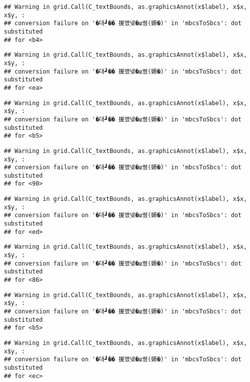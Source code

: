 \documentclass[
]{article}
\begin{document}
\begin{verbatim}
## Warning in grid.Call(C_textBounds, as.graphicsAnnot(x$label), x$x, x$y, :
## conversion failure on '�대┛�� 援먰넻�ш퀬(嫄�)' in 'mbcsToSbcs': dot substituted
## for <b4>
\end{verbatim}

\begin{verbatim}
## Warning in grid.Call(C_textBounds, as.graphicsAnnot(x$label), x$x, x$y, :
## conversion failure on '�대┛�� 援먰넻�ш퀬(嫄�)' in 'mbcsToSbcs': dot substituted
## for <ea>
\end{verbatim}

\begin{verbatim}
## Warning in grid.Call(C_textBounds, as.graphicsAnnot(x$label), x$x, x$y, :
## conversion failure on '�대┛�� 援먰넻�ш퀬(嫄�)' in 'mbcsToSbcs': dot substituted
## for <b5>
\end{verbatim}

\begin{verbatim}
## Warning in grid.Call(C_textBounds, as.graphicsAnnot(x$label), x$x, x$y, :
## conversion failure on '�대┛�� 援먰넻�ш퀬(嫄�)' in 'mbcsToSbcs': dot substituted
## for <90>
\end{verbatim}

\begin{verbatim}
## Warning in grid.Call(C_textBounds, as.graphicsAnnot(x$label), x$x, x$y, :
## conversion failure on '�대┛�� 援먰넻�ш퀬(嫄�)' in 'mbcsToSbcs': dot substituted
## for <ed>
\end{verbatim}

\begin{verbatim}
## Warning in grid.Call(C_textBounds, as.graphicsAnnot(x$label), x$x, x$y, :
## conversion failure on '�대┛�� 援먰넻�ш퀬(嫄�)' in 'mbcsToSbcs': dot substituted
## for <86>
\end{verbatim}

\begin{verbatim}
## Warning in grid.Call(C_textBounds, as.graphicsAnnot(x$label), x$x, x$y, :
## conversion failure on '�대┛�� 援먰넻�ш퀬(嫄�)' in 'mbcsToSbcs': dot substituted
## for <b5>
\end{verbatim}

\begin{verbatim}
## Warning in grid.Call(C_textBounds, as.graphicsAnnot(x$label), x$x, x$y, :
## conversion failure on '�대┛�� 援먰넻�ш퀬(嫄�)' in 'mbcsToSbcs': dot substituted
## for <ec>
\end{verbatim}
\end{document}

